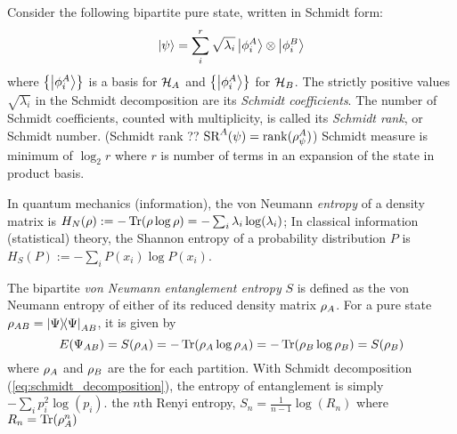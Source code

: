 \begin{definition}\label{def:schmidt_measure}
	Consider the following bipartite pure state, written in Schmidt form:
	\begin{equation}
		\ket{\psi} = \sum_i^r \sqrt{\lambda_i} \ket{\phi_i^A}\otimes\ket{\phi_i^B}
		\label{eq:schmidt_decomposition}
	\end{equation}
	where $\qty{\ket{\phi_i^A}}$ is a basis for $\mathcal{H}_A$ and $\qty{\ket{\phi_i^A}}$ for $\mathcal{H}_B$.
	The strictly positive values $\sqrt{\lambda_i}$ in the Schmidt decomposition are its \emph{Schmidt coefficients}. 
	The number of Schmidt coefficients, counted with multiplicity, is called its \emph{Schmidt rank}, or Schmidt number. (Schmidt rank ?? $\text{SR}^A(\psi)=\rank(\rho_{\psi}^A)$)
	Schmidt measure is minimum of $\log_2 r$ where $r$ is number of terms in an expansion of the state in product basis.
\end{definition}
\begin{definition}[entropy]\label{def:entropy}
	In quantum mechanics (information), the von Neumann \emph{entropy} of a density matrix is $H_N(\rho): = -\Tr(\rho \log \rho)=-\sum_i\lambda_i\log(\lambda_i)$;
	In classical information (statistical) theory, the Shannon entropy of a probability distribution $P$ is  $H_S(P):= -\sum_i P(x_i) \log P(x_i)$.
\end{definition}
\begin{definition}\label{def:entanglement_entropy}
	The bipartite \emph{von Neumann entanglement entropy} $S$
	is defined as the von Neumann entropy of either of
	its reduced density matrix $\rho_A$.
	For a pure state $\rho_{AB}=\op{\Psi}{\Psi}_{AB}$,
	it is given by
	\begin{equation}
		E(\Psi_{AB}) 
		= S(\rho_A)
		= -\Tr(\rho_A \log \rho_A)
		= -\Tr(\rho_B \log \rho_B)
		= S(\rho_B)
	\end{equation}
	where $\rho_A$ and $\rho_B $ 
	are the  for each partition.
	With Schmidt decomposition (\cref{eq:schmidt_decomposition}), the entropy of entanglement is simply $-\sum_ip_i^2\log(p_i)$.
	the $n$th Renyi entropy,
	$S_n = \frac{1}{n-1} \log (R_n)$
	where $R_n = \Tr(\rho^n_A)$
\end{definition}
